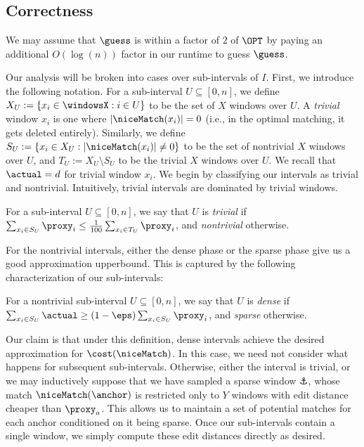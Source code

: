 \label{subsec:correctness}
\subsection{Correctness}
We may assume that $\guess$ is within a factor of $2$ of $\OPT$ by paying an additional $O(\log(n))$ factor in our runtime to guess $\guess$. 

Our analysis will be broken into cases over sub-intervals of $I$. First, we introduce the following notation. For a sub-interval $U \subseteq [0, n]$, we define $X_U := \{x_i \in \windowsX : i \in U\}$ to be the set of $X$ windows over $U$. A \emph{trivial} window $x_i$ is one where $|\niceMatch(x_i)| = 0$ (i.e., in the optimal matching, it gets deleted entirely). 
Similarly, we define $S_U := \{x_i \in X_U : |\niceMatch(x_i)| \neq 0\}$ to be the set of nontrivial $X$ windows over $U$, and $T_U := X_U \setminus S_U$ to be the trivial $X$ windows over $U$. 
We recall that $\actual = d$ for trivial window $x_i$. We begin by classifying our intervals as trivial and nontrivial. Intuitively,  trivial intervals are dominated by trivial windows.

\begin{definition}
    For a sub-interval $U \subseteq [0, n]$, we say that $U$ is \emph{trivial} if $\sum_{x_i \in S_U}\proxy_i \leq \frac{1}{100}\sum_{x_i \in T_U}\proxy_i$, and \emph{nontrivial} otherwise.
\end{definition}

For the nontrivial intervals, either the dense phase or the sparse phase give us a good approximation upperbound. This is captured by the following characterization of our sub-intervals:

\begin{definition}
    For a nontrivial sub-interval $U \subseteq [0, n]$, we say that $U$ is \emph{dense} if $\sum_{x_i \in S_U}\actual \geq (1-\eps)\sum_{x_i \in S_U}\proxy_i$, and \emph{sparse} otherwise.
\end{definition}

Our claim is that under this definition, dense intervals achieve the desired approximation for $\cost(\niceMatch)$. In this case, we need not consider what happens for subsequent sub-intervals. Otherwise, either the interval is trivial, or we may inductively suppose that we have sampled a sparse window $\anchor$, whose match $\niceMatch(\anchor)$ is restricted only to $Y$ windows with edit distance cheaper than $\proxy_a$. This allows us to maintain a set of potential matches for each anchor conditioned on it being sparse. Once our sub-intervals contain a single window, we simply compute these edit distances directly as desired. 

